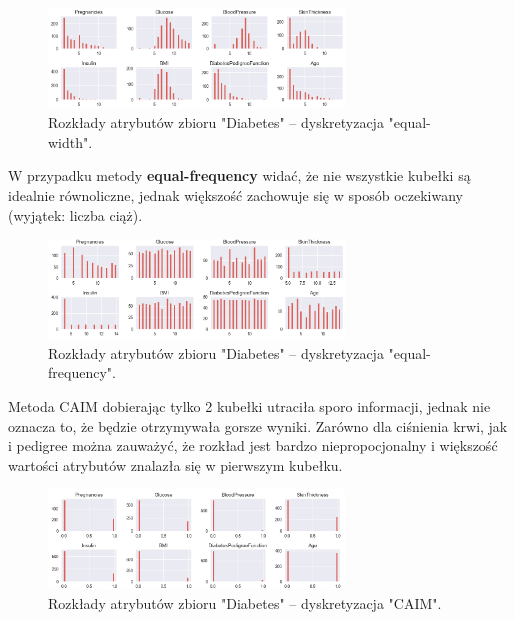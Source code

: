     \begin{figure}[H]
        \center
        \includegraphics[width=0.7\textwidth]{img/discretization/ew_diabetes.png}
        \caption{Rozkłady atrybutów zbioru "Diabetes" -- dyskretyzacja "equal-width".}
    \end{figure}

    W przypadku metody \textbf{equal-frequency} widać, że nie wszystkie kubełki są
    idealnie równoliczne, jednak większość zachowuje się w sposób oczekiwany (wyjątek: liczba ciąż).

    \begin{figure}[H]
        \center
        \includegraphics[width=0.7\textwidth]{img/discretization/ef_diabetes.png}
        \caption{Rozkłady atrybutów zbioru "Diabetes" -- dyskretyzacja "equal-frequency".}
    \end{figure}

    Metoda CAIM dobierając tylko 2 kubełki utraciła sporo informacji, jednak nie oznacza
    to, że będzie otrzymywała gorsze wyniki. Zarówno dla ciśnienia krwi, jak i pedigree
    można zauważyć, że rozkład jest bardzo niepropocjonalny i większość wartości atrybutów
    znalazła się w pierwszym kubełku.

    \begin{figure}[H]
        \center
        \includegraphics[width=0.7\textwidth]{img/discretization/caim_diabetes.png}
        \caption{Rozkłady atrybutów zbioru "Diabetes" -- dyskretyzacja "CAIM".}
    \end{figure}

